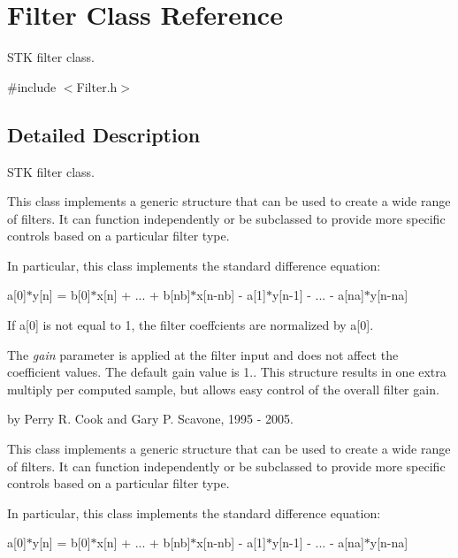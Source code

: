 \hypertarget{class_filter}{}\section{Filter Class Reference}
\label{class_filter}


S\+TK filter class.  




{\ttfamily \#include $<$Filter.\+h$>$}



\subsection{Detailed Description}
S\+TK filter class. 

This class implements a generic structure that can be used to create a wide range of filters. It can function independently or be subclassed to provide more specific controls based on a particular filter type.

In particular, this class implements the standard difference equation\+:

a\mbox{[}0\mbox{]}$\ast$y\mbox{[}n\mbox{]} = b\mbox{[}0\mbox{]}$\ast$x\mbox{[}n\mbox{]} + ... + b\mbox{[}nb\mbox{]}$\ast$x\mbox{[}n-\/nb\mbox{]} -\/ a\mbox{[}1\mbox{]}$\ast$y\mbox{[}n-\/1\mbox{]} -\/ ... -\/ a\mbox{[}na\mbox{]}$\ast$y\mbox{[}n-\/na\mbox{]}

If a\mbox{[}0\mbox{]} is not equal to 1, the filter coeffcients are normalized by a\mbox{[}0\mbox{]}.

The {\itshape gain} parameter is applied at the filter input and does not affect the coefficient values. The default gain value is 1.. This structure results in one extra multiply per computed sample, but allows easy control of the overall filter gain.

by Perry R. Cook and Gary P. Scavone, 1995 -\/ 2005.

This class implements a generic structure that can be used to create a wide range of filters. It can function independently or be subclassed to provide more specific controls based on a particular filter type.

In particular, this class implements the standard difference equation\+:

a\mbox{[}0\mbox{]}$\ast$y\mbox{[}n\mbox{]} = b\mbox{[}0\mbox{]}$\ast$x\mbox{[}n\mbox{]} + ... + b\mbox{[}nb\mbox{]}$\ast$x\mbox{[}n-\/nb\mbox{]} -\/ a\mbox{[}1\mbox{]}$\ast$y\mbox{[}n-\/1\mbox{]} -\/ ... -\/ a\mbox{[}na\mbox{]}$\ast$y\mbox{[}n-\/na\mbox{]}

